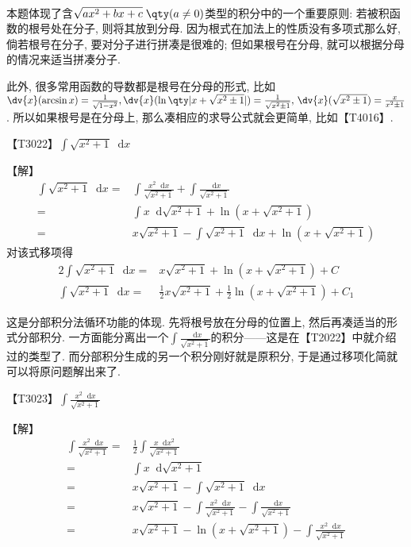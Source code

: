 \documentclass{ctexbook}
\newcommand*{\dif}{\mathop{}\!\mathrm{d}}
\begin{document}
{\begin{align*}
\end{align*}\par
{\kaishu 本题体现了含$\sqrt{ax^{2}+bx+c}\;\qty(a\ne0)$类型的积分中的一个重要原则: 若被积函数的根号处在分子, 则将其放到分母. 因为根式在加法上的性质没有多项式那么好, 倘若根号在分子, 要对分子进行拼凑是很难的; 但如果根号在分母, 就可以根据分母的情况来适当拼凑分子. \par
此外, 很多常用函数的导数都是根号在分母的形式, 比如$\dv{x}(\arcsin{x})=\frac{1}{\sqrt{1-x^{2}}},\\\dv{x}(\ln\qty|x+\sqrt{x^{2}\pm1}|)=\frac{1}{\sqrt{x^{2}\pm1}},\,\dv{x}(\sqrt{x^{2}\pm1})=\frac{x}{x^{2}\pm1}$. 所以如果根号是在分母上, 那么凑相应的求导公式就会更简单, 比如【T4016】. \par}
{\color{red}【T3022】}$\int\sqrt{x^{2}+1}\dif{x}$\par
【解】
\begin{align*}
\int\sqrt{x^{2}+1}\dif{x}={}&\int\frac{x^{2}\dif{x}}{\sqrt{x^{2}+1}}+\int\frac{\dif{x}}{\sqrt{x^{2}+1}}\\
={}&\int x\dif{\sqrt{x^{2}+1}}+\ln(x+\sqrt{x^{2}+1})\\
={}&x\sqrt{x^{2}+1}-\int\sqrt{x^{2}+1}\dif{x}+\ln(x+\sqrt{x^{2}+1})
\end{align*}
对该式移项得
\begin{align*}
2\int\sqrt{x^{2}+1}\dif{x}={}&x\sqrt{x^{2}+1}+\ln(x+\sqrt{x^{2}+1})+C\\
\int\sqrt{x^{2}+1}\dif{x}={}&\frac{1}{2}x\sqrt{x^{2}+1}+\frac{1}{2}\ln(x+\sqrt{x^{2}+1})+C_{1}
\end{align*}\par
{\kaishu 这是分部积分法循环功能的体现. 先将根号放在分母的位置上, 然后再凑适当的形式分部积分. 一方面能分离出一个$\int\frac{\dif{x}}{\sqrt{x^{2}+1}}$的积分——这是在{\color{red}【T2022】}中就介绍过的类型了. 而分部积分生成的另一个积分刚好就是原积分, 于是通过移项化简就可以将原问题解出来了. \par}
{\color{red}【T3023】}$\int\frac{x^{2}\dif{x}}{\sqrt{x^{2}+1}}$\par
【解】
\begin{align*}
\int\frac{x^{2}\dif{x}}{\sqrt{x^{2}+1}}={}&\frac{1}{2}\int\frac{x\dif{x^{2}}}{\sqrt{x^{2}+1}}\\
={}&\int x\dif{\sqrt{x^{2}+1}}\\
={}&x\sqrt{x^{2}+1}-\int\sqrt{x^{2}+1}\dif{x}\\
={}&x\sqrt{x^{2}+1}-\int\frac{x^{2}\dif{x}}{\sqrt{x^{2}+1}}-\int\frac{\dif{x}}{\sqrt{x^{2}+1}}\\
={}&x\sqrt{x^{2}+1}-\ln(x+\sqrt{x^{2}+1})-\int\frac{x^{2}\dif{x}}{\sqrt{x^{2}+1}}

\end{align*}}
\end{document}
